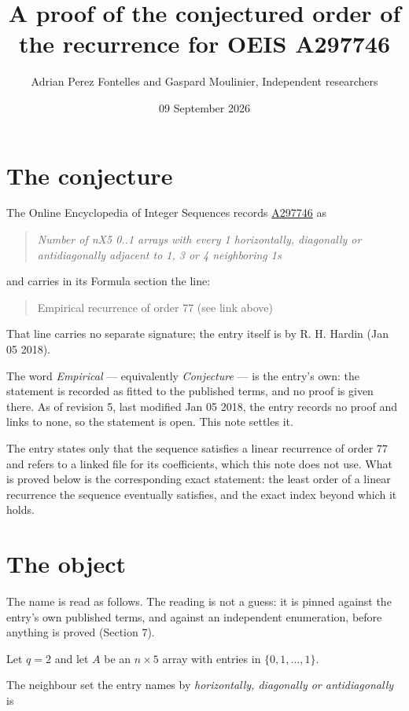 \documentclass[11pt]{article}
\title{A proof of the conjectured order of the recurrence for OEIS A297746}
\author{Adrian Perez Fontelles and Gaspard Moulinier, Independent researchers}
\date{09 September 2026}
\theoremstyle{definition}
\begin{document}
\maketitle
\section{The conjecture}

The Online Encyclopedia of Integer Sequences records \href{https://oeis.org/A297746}{A297746} as

\begin{quote}\itshape Number of nX5 0..1 arrays with every 1 horizontally, diagonally or antidiagonally adjacent to 1, 3 or 4 neighboring 1s\end{quote}

and carries in its Formula section the line:

\begin{quote}\ttfamily Empirical recurrence of order 77 (see link above)\end{quote}

That line carries no separate signature; the entry itself is by R. H. Hardin (Jan 05 2018).

The word {\itshape Empirical} --- equivalently {\itshape Conjecture} --- is the entry's own: the statement is recorded as fitted to the published terms, and no proof is given there. As of revision 5, last modified Jan 05 2018, the entry records no proof and links to none, so the statement is open. This note settles it.

The entry states only that the sequence satisfies a linear recurrence of order $77$ and refers to a linked file for its coefficients, which this note does not use. What is proved below is the corresponding exact statement: the least order of a linear recurrence the sequence eventually satisfies, and the exact index beyond which it holds.

\section{The object}

The name is read as follows. The reading is not a guess: it is pinned against the entry's own published terms, and against an independent enumeration, before anything is proved (Section 7).

Let $q = 2$ and let $A$ be an $n \times 5$ array with entries in $\{0,1,\dots,1\}$.

The neighbour set the entry names by {\itshape horizontally, diagonally or antidiagonally} is
\end{document}
